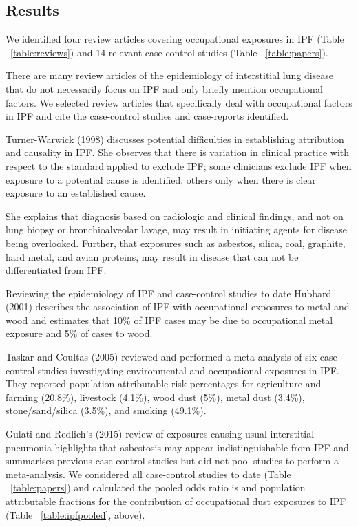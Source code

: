 \documentclass[a4
er,12pt]{article}
\begin{document}
\subsection{Results}

We identified four review articles covering occupational exposures in IPF (Table ~\ref{table:reviews})\cite{Turner-Warwick1998} and 14 relevant case-control studies (Table ~\ref{table:papers}).

There are many review articles of the epidemiology of interstitial lung disease that do not necessarily focus on IPF and only briefly mention occupational factors. We selected review articles that specifically deal with occupational factors in IPF and cite the case-control studies and case-reports identified.

Turner-Warwick (1998)\cite{Turner-Warwick1998} discusses potential difficulties in establishing attribution and causality in IPF. She observes that there is variation in clinical practice with respect to the standard applied to exclude IPF; some clinicians exclude IPF when exposure to a potential cause is identified, others only when there is clear exposure to an established cause. 

She explains that diagnosis based on radiologic and clinical findings, and not on lung biopsy or bronchioalveolar lavage, may result in initiating agents for disease being overlooked. Further, that exposures such as asbestos, silica, coal, graphite, hard metal, and avian proteins, may result in disease that can not be differentiated from IPF.    

Reviewing the epidemiology of IPF and case-control studies to date Hubbard (2001)\cite{Hubbard2001} describes the association of IPF with occupational exposures to metal and wood and estimates that 10\% of IPF cases may be due to occupational metal exposure and 5\% of cases to wood.    

Taskar and Coultas (2005)\cite{Taskar2006} reviewed and performed a meta-analysis of six case-control studies investigating environmental and occupational exposures in IPF. They reported population attributable risk percentages for agriculture and farming (20.8\%), livestock (4.1\%), wood dust (5\%), metal dust (3.4\%), stone/sand/silica (3.5\%), and smoking (49.1\%).

Gulati and Redlich's (2015)\cite{Gulati2015} review of exposures causing usual interstitial pneumonia highlights that asbestosis may appear indistinguishable from IPF and summarises previous case-control studies but did not pool studies to perform a meta-analysis. We considered all case-control studies to date (Table ~\ref{table:papers}) and calculated the pooled odds ratio is and population attributable fractions for the contribution of occupational dust exposures to IPF (Table ~\ref{table:ipfpooled}, above).  
\end{document}
